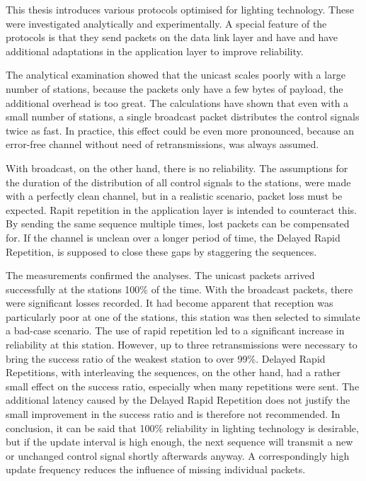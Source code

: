 This thesis introduces various protocols optimised for lighting technology.
These were investigated analytically and experimentally.
A special feature of the protocols is that they send packets on the data link layer and have
and have additional adaptations in the application layer to improve reliability.

The analytical examination showed that the unicast
scales poorly with a large number of stations,
because the packets only have a few bytes of payload, the additional overhead is too great.
The calculations have shown that even with a small number of stations, a single broadcast packet
distributes the control signals twice as fast.
In practice, this effect could be even more pronounced,
because an error-free channel without need of retransmissions, was always assumed.

With broadcast, on the other hand, there is no reliability.
The assumptions for the duration of the distribution of all control signals to the stations,
were made with a perfectly clean channel,
but in a realistic scenario, packet loss must be expected.
Rapit repetition in the application layer is intended to counteract this.
By sending the same sequence multiple times, lost packets can be compensated for.
If the channel is unclean over a longer period of time, the Delayed Rapid Repetition,
is supposed to close these gaps by staggering the sequences.

The measurements confirmed the analyses.
The unicast packets arrived successfully at the stations 100\% of the time.
With the broadcast packets, there were significant losses recorded.
It had become apparent that reception was particularly poor at one of the stations,
this station was then selected to simulate a bad-case scenario.
The use of rapid repetition led to a significant increase in reliability at this station.
However, up to three retransmissions were necessary to bring the success ratio of the weakest station to over 99\%.
Delayed Rapid Repetitions, with interleaving the sequences, on the other hand, 
had a rather small effect on the success ratio,
especially when many repetitions were sent.
The additional latency caused by the Delayed Rapid Repetition
does not justify the small improvement in the success ratio and is therefore not recommended.
In conclusion, it can be said that 100\% reliability in lighting technology is desirable,
but if the update interval is high enough,
the next sequence will transmit a new or unchanged control signal shortly afterwards anyway.
A correspondingly high update frequency reduces the influence of missing individual packets.

